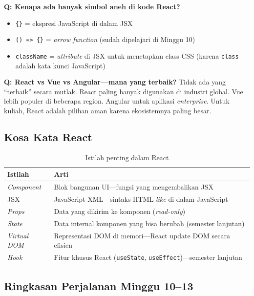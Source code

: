 \begin{catatan}
\textbf{Q: Kenapa ada banyak simbol aneh di kode React?}
\begin{itemize}
  \item \texttt{\{\}} = ekspresi JavaScript di dalam JSX
  \item \texttt{() => \{\}} = \emph{arrow function} (sudah dipelajari di Minggu 10)
  \item \texttt{className} = \emph{attribute} di JSX untuk menetapkan class CSS (karena \texttt{class} adalah kata kunci JavaScript)
\end{itemize}
\end{catatan}

\begin{catatan}
\textbf{Q: React vs Vue vs Angular---mana yang terbaik?}
Tidak ada yang ``terbaik'' secara mutlak. React paling banyak digunakan di industri global. Vue lebih populer di beberapa region. Angular untuk aplikasi \emph{enterprise}. Untuk kuliah, React adalah pilihan aman karena ekosistemnya paling besar.
\end{catatan}

\subsection{Kosa Kata React}

\begin{table}[htbp]
\centering
\caption{Istilah penting dalam React}
\label{tab:13-kosakata}
\begin{tabular}{ll}
\toprule
\textbf{Istilah} & \textbf{Arti} \\
\midrule
\emph{Component} & Blok bangunan UI---fungsi yang mengembalikan JSX \\
JSX & JavaScript XML---sintaks HTML-\emph{like} di dalam JavaScript \\
\emph{Props} & Data yang dikirim ke komponen (\emph{read-only}) \\
\emph{State} & Data internal komponen yang bisa berubah (semester lanjutan) \\
\emph{Virtual DOM} & Representasi DOM di memori---React update DOM secara efisien \\
\emph{Hook} & Fitur khusus React (\texttt{useState}, \texttt{useEffect})---semester lanjutan \\
\bottomrule
\end{tabular}
\end{table}

\subsection{Ringkasan Perjalanan Minggu 10--13}

